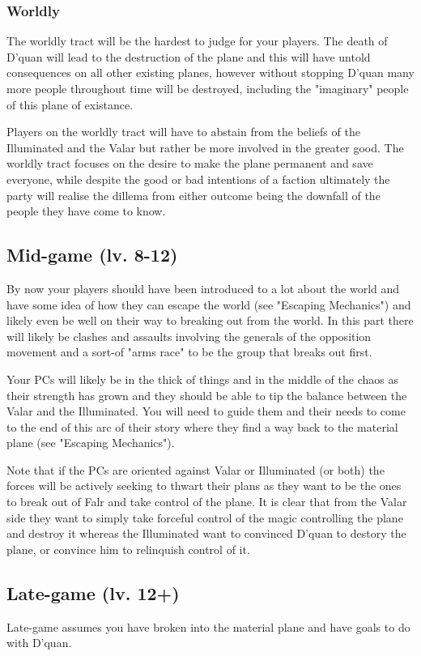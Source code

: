\documentclass[10pt,twoside,twocolumn]{article}
\begin{document}
\subsubsection{Worldly}
The worldly tract will be the hardest to judge for your players. The death of D'quan will lead to the destruction of the plane and this will have untold consequences on all other existing planes, however without stopping D'quan many more people throughout time will be destroyed, including the "imaginary" people of this plane of existance.

Players on the worldly tract will have to abstain from the beliefs of the Illuminated and the Valar but rather be more involved in the greater good. The worldly tract focuses on the desire to make the plane permanent and save everyone, while despite the good or bad intentions of a faction ultimately the party will realise the dillema from either outcome being the downfall of the people they have come to know.

\subsection{Mid-game (lv. 8-12)}
By now your players should have been introduced to a lot about the world and have some idea of how they can escape the world (see "Escaping Mechanics") and likely even be well on their way to breaking out from the world. In this part there will likely be clashes and assaults involving the generals of the opposition movement and a sort-of "arms race" to be the group that breaks out first.

Your PCs will likely be in the thick of things and in the middle of the chaos as their strength has grown and they should be able to tip the balance between the Valar and the Illuminated. You will need to guide them and their needs to come to the end of this arc of their story where they find a way back to the material plane (see "Escaping Mechanics").

Note that if the PCs are oriented against Valar or Illuminated (or both) the forces will be actively seeking to thwart their plans as they want to be the ones to break out of Falr and take control of the plane. It is clear that from the Valar side they want to simply take forceful control of the magic controlling the plane and destroy it whereas the Illuminated want to convinced D'quan to destory the plane, or convince him to relinquish control of it.

\subsection{Late-game (lv. 12+)}
Late-game assumes you have broken into the material plane and have goals to do with D'quan.
\end{document}
